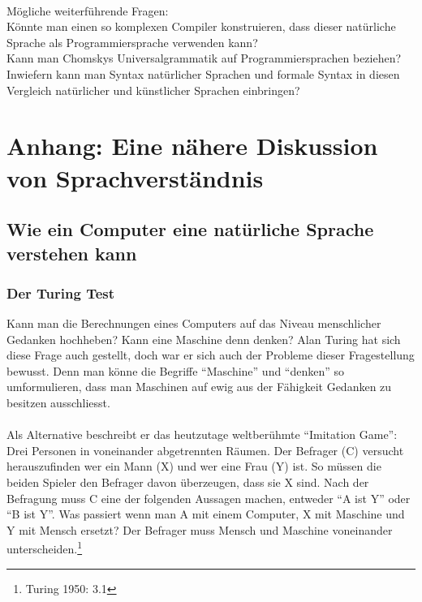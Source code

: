 \documentclass[10pt,a4paper]{article}
\begin{document}
\\
Mögliche weiterführende Fragen: \\
Könnte man einen so komplexen Compiler konstruieren, dass dieser natürliche Sprache als Programmiersprache verwenden kann? \\
Kann man Chomskys Universalgrammatik auf Programmiersprachen beziehen? \\
Inwiefern kann man Syntax natürlicher Sprachen und formale Syntax in diesen Vergleich natürlicher und künstlicher Sprachen einbringen? \\

\newpage
\renewcommand\thesection{\roman{section}}
\setcounter{section}{0}


\section{Anhang: Eine nähere Diskussion von Sprachverständnis}

\subsection{Wie ein Computer eine natürliche Sprache verstehen kann}
\subsubsection{Der Turing Test}
Kann man die Berechnungen eines Computers auf das Niveau menschlicher Gedanken hochheben? Kann eine Maschine denn denken? Alan Turing hat sich diese Frage auch gestellt, doch war er sich auch der Probleme dieser Fragestellung bewusst. Denn man könne die Begriffe \enquote{Maschine} und \enquote{denken} so umformulieren, dass man Maschinen auf ewig aus der Fähigkeit Gedanken zu besitzen ausschliesst.\\
\\
Als Alternative beschreibt er das heutzutage weltberühmte \enquote{Imitation Game}:
Drei Personen in voneinander abgetrennten Räumen. Der Befrager (C) versucht herauszufinden wer ein Mann (X) und wer eine Frau (Y) ist. So müssen die beiden Spieler den Befrager davon überzeugen, dass sie X sind. Nach der Befragung muss C eine der folgenden Aussagen machen, entweder \enquote{A ist Y} oder \enquote{B ist Y}. Was passiert wenn man A mit einem Computer, X mit Maschine und Y mit Mensch ersetzt? Der Befrager muss Mensch und Maschine voneinander unterscheiden.\footnote{Turing 1950: 3.1} \\
\end{document}
